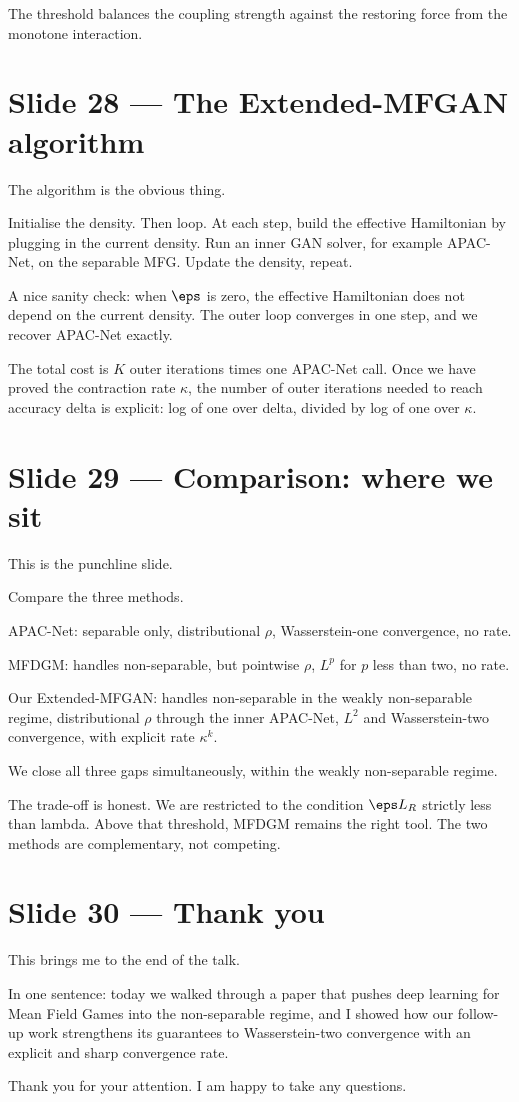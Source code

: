 \documentclass[11pt]{article}
\begin{document}
The threshold balances the coupling strength against the restoring
force from the monotone interaction.

\section*{Slide 28 --- The Extended-MFGAN algorithm}

The algorithm is the obvious thing.

Initialise the density.  Then loop.  At each step, build the effective
Hamiltonian by plugging in the current density.  Run an inner GAN
solver, for example APAC-Net, on the separable MFG.  Update the
density, repeat.

A nice sanity check: when $\eps$ is zero, the effective Hamiltonian
does not depend on the current density.  The outer loop converges in
one step, and we recover APAC-Net exactly.

The total cost is $K$ outer iterations times one APAC-Net call.  Once
we have proved the contraction rate $\kappa$, the number of outer
iterations needed to reach accuracy delta is explicit: log of one over
delta, divided by log of one over $\kappa$.

\section*{Slide 29 --- Comparison: where we sit}

This is the punchline slide.

Compare the three methods.

APAC-Net: separable only, distributional $\rho$, Wasserstein-one
convergence, no rate.

MFDGM: handles non-separable, but pointwise $\rho$, $L^p$ for $p$ less
than two, no rate.

Our Extended-MFGAN: handles non-separable in the weakly non-separable
regime, distributional $\rho$ through the inner APAC-Net, $L^2$ and
Wasserstein-two convergence, with explicit rate $\kappa^k$.

We close all three gaps simultaneously, within the weakly non-separable
regime.

The trade-off is honest.  We are restricted to the condition
$\eps L_R$ strictly less than lambda.  Above that threshold, MFDGM
remains the right tool.  The two methods are complementary, not
competing.

\section*{Slide 30 --- Thank you}

This brings me to the end of the talk.

In one sentence: today we walked through a paper that pushes deep
learning for Mean Field Games into the non-separable regime, and I
showed how our follow-up work strengthens its guarantees to
Wasserstein-two convergence with an explicit and sharp convergence
rate.

Thank you for your attention.  I am happy to take any questions.
\end{document}
